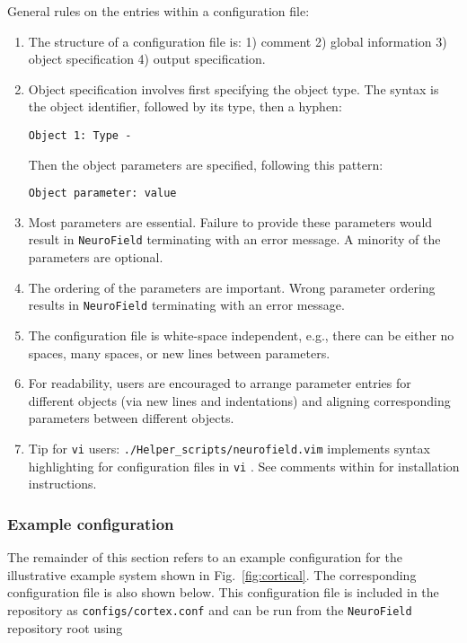 \documentclass[12pt,a4paper]{article}
\newcommand{\type}[1]{{\small\small\tt #1} }
\newcommand{\NF}[0]{\type{NeuroField}}
\begin{document}
General rules on the entries within a configuration file:

\begin{enumerate}
    \item The structure of a configuration file is: 1) comment 2) global information 3) object specification 4) output specification.
    \item Object specification involves first specifying the object type. The syntax is the object identifier, followed by its type, then a hyphen:
        \begin{lstlisting}
Object 1: Type -
        \end{lstlisting}
        Then the object parameters are specified, following this pattern:
        \begin{lstlisting}
Object parameter: value
        \end{lstlisting}
    \item Most parameters are essential. Failure to provide these parameters would result in \NF terminating with an error message. A minority of the parameters are optional.
    \item The ordering of the parameters are important. Wrong parameter ordering results in \NF terminating with an error message.
    \item The configuration file is white-space independent, e.g., there can be either no spaces, many spaces, or new lines between parameters.
    \item For readability, users are encouraged to arrange parameter entries for different objects (via new lines and indentations) and aligning corresponding parameters between different objects.
    \item Tip for \type{vi} users: \type{./Helper\_scripts/neurofield.vim} implements syntax highlighting for configuration files in \type{vi}. See comments within for installation instructions.
\end{enumerate}

\subsubsection{Example configuration}
The remainder of this section refers to an example configuration for the illustrative example system shown in Fig.~\ref{fig:cortical}. The corresponding configuration file is also shown below. This configuration file is included in the repository as \type{configs/cortex.conf} and can be run from the \NF repository root using
\end{document}

